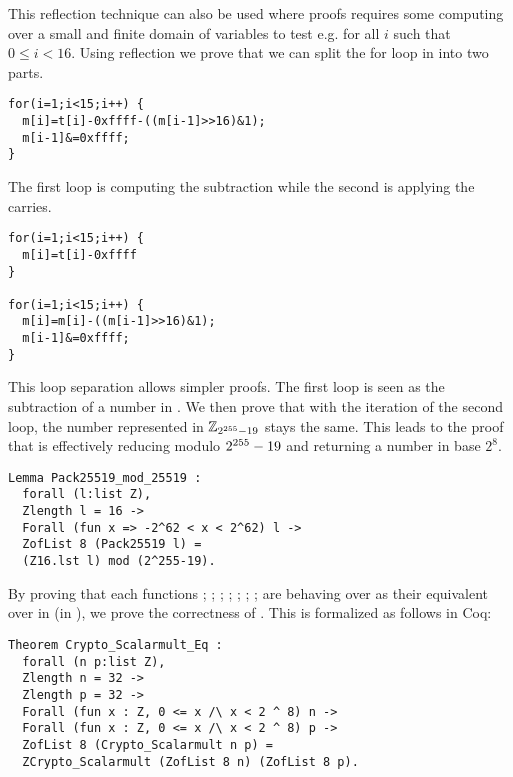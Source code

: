 This reflection technique can also be used where proofs requires some computing
over a small and finite domain of variables to test e.g. for all $i$ such that $0 \le i < 16$.
Using reflection we prove that we can split the for loop in  into two parts.
\begin{lstlisting}[language=Ctweetnacl]
for(i=1;i<15;i++) {
  m[i]=t[i]-0xffff-((m[i-1]>>16)&1);
  m[i-1]&=0xffff;
}
\end{lstlisting}
The first loop is computing the subtraction while the second is applying the carries.
\begin{lstlisting}[language=Ctweetnacl]
for(i=1;i<15;i++) {
  m[i]=t[i]-0xffff
}

for(i=1;i<15;i++) {
  m[i]=m[i]-((m[i-1]>>16)&1);
  m[i-1]&=0xffff;
}
\end{lstlisting}

This loop separation allows simpler proofs. The first loop is seen as the subtraction of a number in \Zfield.
We then prove that with the iteration of the second loop, the number represented in $\mathbb{Z}_{2^{255}-19}$ stays the same.
This leads to the proof that  is effectively reducing modulo $2^{255}-19$ and returning a number in base $2^8$.
\begin{lstlisting}[language=Coq]
Lemma Pack25519_mod_25519 :
  forall (l:list Z),
  Zlength l = 16 ->
  Forall (fun x => -2^62 < x < 2^62) l ->
  ZofList 8 (Pack25519 l) =
  (Z16.lst l) mod (2^255-19).
\end{lstlisting}

By proving that each functions ; ; ; ;
; ; ;  are behaving over 
as their equivalent over  in  (in \Zfield), we prove the correctness of
. This is formalized as follows in Coq:
\begin{lstlisting}[language=Coq]
Theorem Crypto_Scalarmult_Eq :
  forall (n p:list Z),
  Zlength n = 32 ->
  Zlength p = 32 ->
  Forall (fun x : Z, 0 <= x /\ x < 2 ^ 8) n ->
  Forall (fun x : Z, 0 <= x /\ x < 2 ^ 8) p ->
  ZofList 8 (Crypto_Scalarmult n p) =
  ZCrypto_Scalarmult (ZofList 8 n) (ZofList 8 p).
\end{lstlisting}
